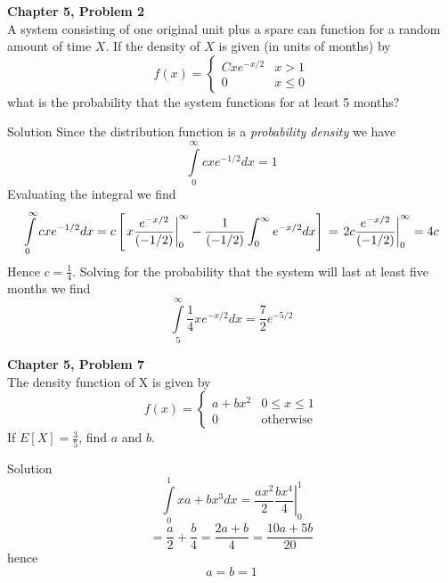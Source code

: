 \documentclass{article}
\begin{document}
\begin{spacing}{1.1}
\newpage
\begin{homeworkProblem}
  {\bf Chapter 5, Problem 2}\\
  A system consisting of one original unit plus a spare can 
  function for a random amount of time $X$. If the density of $X$ 
  is given (in units of months) by
  \[f(x) =
      \left\{
        \begin{array}{lr}
          C x e^{ -x/2} & x > 1 \\ 
          0 & x \le 0
        \end{array}
      \right.\]
  what is the probability that the system functions 
  for at least 5 months?
  \begin{homeworkSection}{Solution}
    Since the distribution function is a \emph{probability density} we have
      \[\int\limits_{0}^{\infty} c x e^{-1/2} dx = 1\]
    Evaluating the integral we find
      \[\int\limits_{0}^{\infty} c x e^{-1/2} dx 
      =  c \left[ \left.x \frac{ e^{-x/2}}{ (-1/2)} \right|_{0}^{\infty} - \frac{ 1}{ (-1/2)} \int_{0}^{\infty} e^{-x/2} dx\right]
      \\= \left. 2 c \frac{ e^{-x/2}}{ (-1/2)} \right|_{0}^{\infty} = 4 c\]
    Hence $c = \frac{ 1}{ 4}$.  Solving for the probability that the system will
    last at least five months we find
      \[\int\limits_{5}^{\infty} \frac{ 1}{ 4} x e^{-x/2} dx = \frac{ 7}{ 2} e^{-5/2}\]
  \end{homeworkSection}
\end{homeworkProblem}

\newpage
\begin{homeworkProblem}
  {\bf Chapter 5, Problem 7}\\
  The density function of X is given by
  \[f(x) =
      \left\{
        \begin{array}{lr}
          a + b x^2 & 0 \le x \le 1 \\ 
          0 & \text{otherwise}
        \end{array}
      \right.\]
  If $E[ X] = \frac{ 3}{ 5}$, find $a$ and $b$.
  \begin{homeworkSection}{Solution}
    \[\int\limits_{0}^{1} xa + bx^3 dx = \left. \frac{ a x^2}{ 2} \frac{ bx^4}{ 4}\right|_0^1\]
    \[= \frac{ a }{ 2} + \frac{ b}{ 4} = \frac{ 2 a + b}{ 4} = \frac{ 10 a + 5 b}{ 20} \]
    hence 
    \[a = b = 1\]
  \end{homeworkSection}
\end{homeworkProblem}


\end{spacing}
\end{document}
